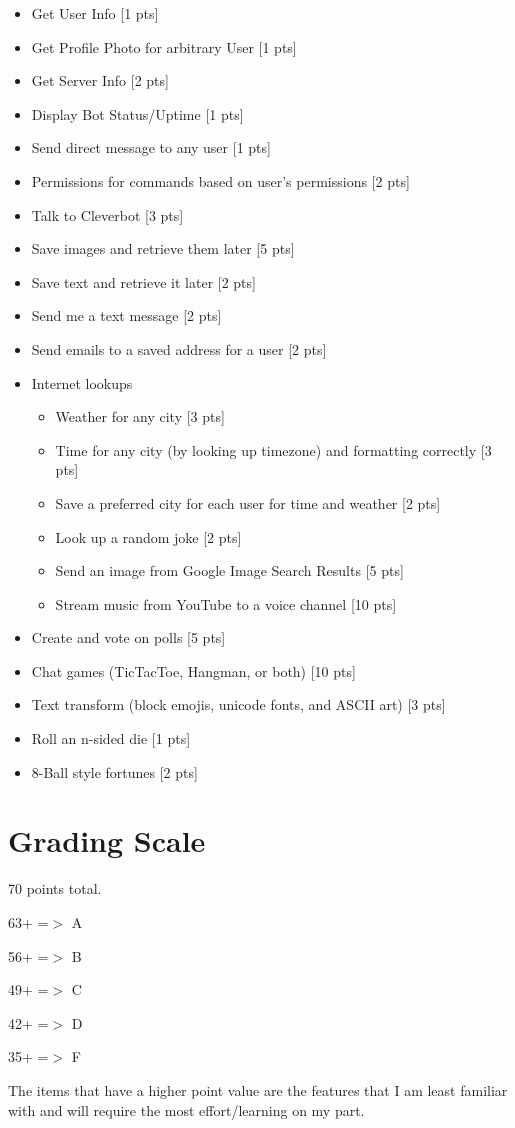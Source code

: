 \documentclass[11pt]{article}
\begin{document}
		\begin{itemize}

			\item Get User Info [1 pts]
			\item Get Profile Photo for arbitrary User [1 pts]
			\item Get Server Info [2 pts]
			\item Display Bot Status/Uptime [1 pts]
			\item Send direct message to any user [1 pts]
            \item Permissions for commands based on user's permissions [2 pts]
			\item Talk to Cleverbot [3 pts]
			\item Save images and retrieve them later [5 pts]
			\item Save text and retrieve it later [2 pts]
			\item Send me a text message [2 pts]
            \item Send emails to a saved address for a user [2 pts]
			\item Internet lookups
				\begin{itemize}
					\item Weather for any city [3 pts]
					\item Time for any city (by looking up timezone) and formatting correctly [3 pts]
                    \item Save a preferred city for each user for time and weather [2 pts]
					\item Look up a random joke [2 pts]
					\item Send an image from Google Image Search Results [5 pts]
					\item Stream music from YouTube to a voice channel [10 pts]
				\end{itemize}
			\item Create and vote on polls [5 pts]
			\item Chat games (TicTacToe, Hangman, or both) [10 pts]
			\item Text transform (block emojis, unicode fonts, and ASCII art) [3 pts]
			\item Roll an n-sided die [1 pts]
			\item 8-Ball style fortunes [2 pts]

		\end{itemize}



    \section{Grading Scale}

        70 points total.

        63+ =$>$ A

        56+ =$>$ B

        49+ =$>$ C

        42+ =$>$ D

        35+ =$>$ F

        The items that have a higher point value are the features that I am least familiar with and will require the most effort/learning on my part.
\end{document}
